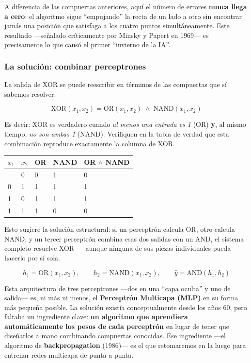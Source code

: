 \documentclass[
  letterpaper,
  DIV=11,
  numbers=noendperiod]{scrartcl}
\newcounter{none} %
\begin{document}
A diferencia de las compuertas anteriores, aquí el número de errores
\textbf{nunca llega a cero}: el algoritmo sigue ``empujando'' la recta
de un lado a otro sin encontrar jamás una posición que satisfaga a los
cuatro puntos simultáneamente. Este resultado ---señalado críticamente
por Minsky y Papert en 1969--- es precisamente lo que causó el primer
``invierno de la IA''.

\subsubsection{La solución: combinar
perceptrones}\label{la-soluciuxf3n-combinar-perceptrones}

La salida de XOR se puede reescribir en términos de las compuertas que
sí sabemos resolver:

\[
\text{XOR}(x_1, x_2) = \text{OR}(x_1, x_2) \;\land\; \text{NAND}(x_1, x_2)
\]

Es decir: XOR es verdadero cuando \emph{al menos una entrada es 1} (OR)
\textbf{y}, al mismo tiempo, \emph{no son ambas 1} (NAND). Verifiquen en
la tabla de verdad que esta combinación reproduce exactamente la columna
de XOR.

{\def\LTcaptype{none} %
\begin{longtable}[]{@{}lllll@{}}
\toprule\noalign{}
\(x_1\) & \(x_2\) & OR & NAND & OR \(\land\) NAND \\
\midrule\noalign{}
\endhead
\bottomrule\noalign{}
\endlastfoot
0 & 0 & 0 & 1 & 0 \\
0 & 1 & 1 & 1 & 1 \\
1 & 0 & 1 & 1 & 1 \\
1 & 1 & 1 & 0 & 0 \\
\end{longtable}
}

Esto sugiere la solución estructural: si un perceptrón calcula OR, otro
calcula NAND, y un tercer perceptrón combina esas dos salidas con un
AND, el sistema completo resuelve XOR --- aunque ninguna de sus piezas
individuales pueda hacerlo por sí sola.

\[
h_1 = \text{OR}(x_1, x_2), \qquad h_2 = \text{NAND}(x_1, x_2), \qquad \hat{y} = \text{AND}(h_1, h_2)
\]

Esta arquitectura de tres perceptrones ---dos en una ``capa oculta'' y
uno de salida--- es, ni más ni menos, el \textbf{Perceptrón Multicapa
(MLP)} en su forma más pequeña posible. La solución existía
conceptualmente desde los años 60, pero faltaba un ingrediente clave:
\textbf{un algoritmo que aprendiera automáticamente los pesos de cada
perceptrón} en lugar de tener que diseñarlos a mano combinando
compuertas conocidas. Ese ingrediente ---el algoritmo de
\textbf{backpropagation} (1986)--- es el que retomaremos en la luego
para entrenar redes multicapa de punta a punta.
\end{document}
